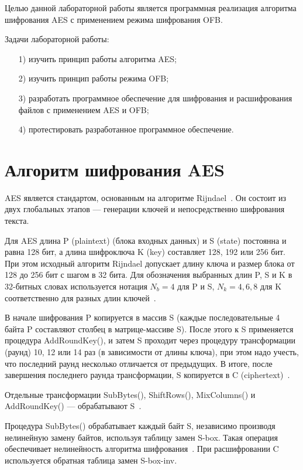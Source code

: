 \documentclass{bmstu}
\begin{document}
Целью данной лабораторной работы является программная реализация алгоритма шифрования AES с применением режима шифрования OFB.

Задачи лабораторной работы:
\begin{enumerate}
\item[1)] изучить принцип работы алгоритма AES;
\item[2)] изучить принцип работы режима OFB;
\item[3)] разработать программное обеспечение для шифрования и расшифрования файлов с применением AES и OFB;
\item[4)] протестировать разработанное программное обеспечение.
\end{enumerate}

\chapter{Алгоритм шифрования AES}

AES является стандартом, основанным на алгоритме Rijndael~\cite{wiki-aes}. 
Он состоит из двух глобальных этапов --- генерации ключей и непосредственно шифрования текста.

Для AES длина P (plaintext) (блока входных данных) и S (state) постоянна и равна 128 бит, а длина шифроключа K (key) составляет 128, 192 или 256 бит. 
При этом исходный алгоритм Rijndael допускает длину ключа и размер блока от 128 до 256 бит с шагом в 32 бита. 
Для обозначения выбранных длин P, S и K в 32-битных словах используется нотация $N_b = 4$ для P и S, $N_k = 4, 6, 8$ для K соответственно для разных длин ключей~\cite{wiki-aes}. 

В начале шифрования P копируется в массив S (каждые последовательные 4 байта P составляют столбец в матрице-массиве S). 
После этого к S применяется процедура AddRoundKey(), и затем S проходит через процедуру трансформации (раунд) 10, 12 или 14 раз (в зависимости от длины ключа), при этом надо учесть, что последний раунд несколько отличается от предыдущих. 
В итоге, после завершения последнего раунда трансформации, S копируется в C (ciphertext)~\cite{wiki-aes}.

Отдельные трансформации SubBytes(), ShiftRows(), MixColumns() и AddRoundKey() --- обрабатывают S~\cite{wiki-aes}. 

Процедура SubBytes() обрабатывает каждый байт S, независимо производя нелинейную замену байтов, используя таблицу замен S-box. 
Такая операция обеспечивает нелинейность алгоритма шифрования~\cite{wiki-aes}. 
При расшифровании C используется обратная таблица замен S-box-inv.
\end{document}

